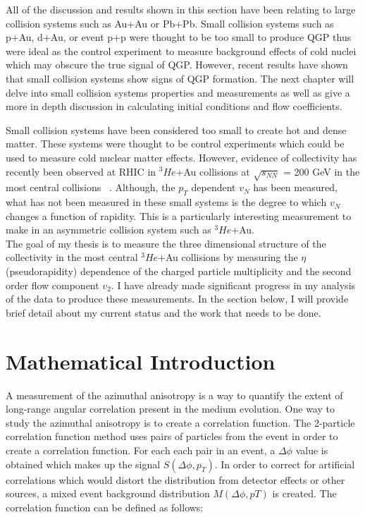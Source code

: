 All of the discussion and results shown in this section have been relating to large collision systems such as Au+Au or Pb+Pb. Small collision systems such as p+Au, d+Au, or event p+p were thought to be too small to produce QGP thus were ideal as the control experiment to measure background effects of cold nuclei which may obscure the true signal of QGP. However, recent results have shown that small collision systems show signs of QGP formation. The next chapter will delve into small collision systems properties and measurements as well as give a more in depth discussion in calculating initial conditions and flow coefficients.

\iffalse

Small collision systems have been considered too small to create hot and dense matter. These systems were thought to be control experiments which could be used to measure cold nuclear matter effects. However, evidence of collectivity has recently been observed at RHIC in $^3He$+Au collisions at $\sqrt{s_{NN}}$ = 200 GeV in the most central collisions ~\cite{PhysRevLett.115.142301}. Although, the $p_T$ dependent $v_N$ has been measured, what has not been measured in these small systems is the degree to which $v_N$ changes a function of rapidity. This is a particularly interesting measurement to make in an asymmetric collision system such as $^3He$+Au.\\

The goal of my thesis is to measure the three dimensional structure of the collectivity in the most central $^3He$+Au collisions by measuring the $\eta$ (pseudorapidity) dependence of the charged particle multiplicity and the second order flow component $v_2$. I have already made significant progress in my analysis of the data to produce these measurements. In the section below, I will provide brief detail about my current status and the work that needs to be done.

\section{Mathematical Introduction}
A measurement of the azimuthal anisotropy is a way to quantify the extent of long-range angular correlation present in the medium evolution. One way to study the azimuthal anisotropy is to create a correlation function. The 2-particle correlation function method uses pairs of particles from the event in order to create a correlation function. For each each pair in an event, a $\Delta\phi$ value is obtained which makes up the signal $S(\Delta\phi,p_T)$. In order to correct for artificial correlations which would distort the distribution from detector effects or other sources, a mixed event background distribution $M(\Delta\phi,pT)$ is created. The correlation function can be defined as follows:

